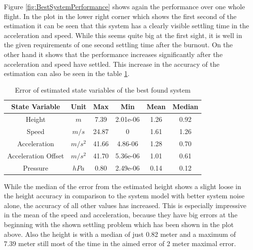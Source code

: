 Figure \ref{fig:BestSystemPerformance} shows again the performance over one whole flight.
In the plot in the lower right corner which shows the first second of the estimation it can be seen that this system has a clearly visible settling time in the acceleration and speed.
While this seems quite big at the first sight, it is well in the given requirements of one second settling time after the burnout.
On the other hand it shows that the performance increases significantly after the acceleration and speed have settled.
This increase in the accuracy of the estimation can also be seen in the table \ref{tab:ErrorBestPerformanceSystem}.

\begin{table}[h!]
\centering
\begin{tabular}{cccccc}
\hline
\multicolumn{1}{|c|}{State Variable} & \multicolumn{1}{c|}{Unit} & \multicolumn{1}{c|}{Max} & \multicolumn{1}{c|}{Min} & \multicolumn{1}{c|}{Mean} & \multicolumn{1}{c|}{Median} \\ \hline
Height                            & $m$                         & 7.39	                  & 2.01e-06                 & 1.26                    & 0.92                      \\
Speed                             & $m/s$                       & 24.87                   & 0                        & 1.61                    & 1.26                      \\
Acceleration                       & $m/s^2$   			& 41.66                   & 4.86-06                  & 1.28                    & 0.70                     \\
Acceleration Offset                & $m/s^2$   			& 41.70                   & 5.36e-06                 & 1.01                    & 0.61                     \\
Pressure		          & $hPa$   			& 0.80                    & 2.49e-06                 & 0.14                    & 0.12
\end{tabular}
\caption{Error of estimated state variables of the best found system}
\label{tab:ErrorBestPerformanceSystem}
\end{table}

While the median of the error from the estimated height shows a slight loose in the height accuracy in comparison to the system model with better system noise alone,
the accuracy of all other values has increased.
This is especially impressive in the mean of the speed and acceleration, because they have big errors at the beginning with the shown settling problem which has been shown in the plot above.
Also the height is with a median of just 0.82 meter and a maximum of 7.39 meter still most of the time in the aimed error of 2 meter maximal error.

